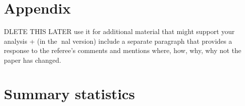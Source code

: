 \documentclass[11pt]{article}
\begin{document}
	
	
	\newpage
	
	\begin{subappendices}
		\appendix
		
		\section*{Appendix}\label{Appendix}
		DLETE THIS LATER use it for additional material that might support your analysis + (in the nal
		version) include a separate paragraph that provides a response to the referee's comments
		and mentions where, how, why, why not the paper has changed.
		\singlespacing
		\section{Summary statistics}\label{ASec:xxxxx}
		
	\end{subappendices}	
	
	
	
	\newpage
	{\footnotesize 
		
		\singlespacing
		
	}
	
	
\end{document}

